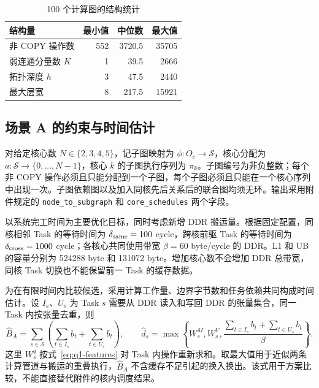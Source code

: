 \begin{table}[htbp]
\centering
\caption{100 个计算图的结构统计}
\label{tab:q1-structure}
\begin{tabular}{lrrr}
\hline
结构量 & 最小值 & 中位数 & 最大值 \\
\hline
非 COPY 操作数 & 552 & 3720.5 & 35705 \\
弱连通分量数 $K$ & 1 & 39.5 & 2666 \\
拓扑深度 $h$ & 3 & 47.5 & 2440 \\
最大层宽 & 8 & 217.5 & 15921 \\
\hline
\end{tabular}
\end{table}

\subsection{场景 A 的约束与时间估计}
对给定核心数 $N\in\{2,3,4,5\}$，记子图映射为 $\phi:O_c\to\mathcal S$，核心分配为 $a:\mathcal S\to\{0,\ldots,N-1\}$，核心 $k$ 的子图执行序列为 $\pi_k$。子图编号为非负整数；每个非 COPY 操作必须且只能分配到一个子图，每个子图必须且只能在一个核心序列中出现一次。子图依赖图以及加入同核先后关系后的联合图均须无环。输出采用附件规定的 \texttt{node\_to\_subgraph} 和 \texttt{core\_schedules} 两个字段。

以系统完工时间为主要优化目标，同时考虑新增 DDR 搬运量。根据固定配置，同核相邻 Task 的等待时间为 $\delta_{\rm same}=100$ cycle，跨核前驱 Task 的等待时间为 $\delta_{\rm cross}=1000$ cycle；各核心共同使用带宽 $\beta=60$ byte/cycle 的 DDR。L1 和 UB 的容量分别为 524288 byte 和 131072 byte。增加核心数不会增加 DDR 总带宽，同核 Task 切换也不能保留前一 Task 的缓存数据。

为在有限时间内比较候选，采用计算工作量、边界字节数和任务依赖共同构成时间估计。设 $I_s$、$U_s$ 为 Task $s$ 需要从 DDR 读入和写回 DDR 的张量集合，同一 Task 内按张量去重，则
\begin{equation}
\widehat B_A=\sum_{s\in\mathcal S}\left(\sum_{t\in I_s}b_t+\sum_{t\in U_s}b_t\right),\qquad
\widehat d_s=\max\left\{W_s^M,W_s^V,
\frac{\sum_{t\in I_s}b_t+\sum_{t\in U_s}b_t}{\beta}\right\}.
\label{eq:q1-duration}
\end{equation}
这里 $W_s^q$ 按式~\eqref{eq:q1-features} 对 Task 内操作重新求和。取最大值用于近似两条计算管道与搬运的重叠执行，$\widehat B_A$ 不含缓存不足引起的换入换出。该式用于方案比较，不能直接替代附件的核内调度结果。

